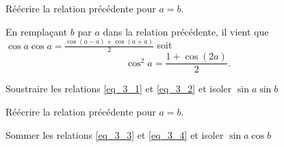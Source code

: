 \begin{enonce}
	Réécrire la relation précédente pour $a=b$.
	\end{enonce}
	
	
	\begin{corrige}
		En remplaçant $b$ par $a$ dans la relation précédente, il vient que $\cos a \cos a = \frac{\cos \left( a - a \right) + \cos \left( a + a \right)}{2}$ soit
		$$
		\cos^2 a = \frac{1 + \cos \left( 2a \right)}{2}.
		$$
	\end{corrige}




\begin{enonce}
	Soustraire les relations \eqref{eq_3_1} et \eqref{eq_3_2} et isoler $\sin a \sin b$
	\end{enonce}
	
	
		




\begin{enonce}
	Réécrire la relation précédente pour $a=b$.
	\end{enonce}
	
	
		



\begin{enonce}
	Sommer les relations \eqref{eq_3_3} et \eqref{eq_3_4} et isoler $\sin a \cos b$
	\end{enonce}
	
